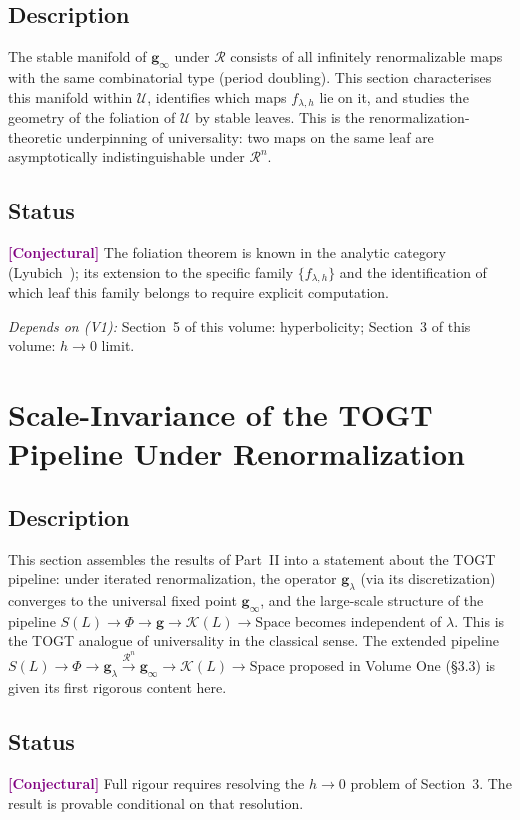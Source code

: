 \documentclass[11pt]{article}
\newcommand{\conjectural}{\textcolor{purple}{\textbf{[Conjectural]}}}
\newcommand{\depends}[1]{\smallskip\noindent\textit{Depends on (V1):} #1.\smallskip}
\newcommand{\g}{\boldsymbol{g}}
\begin{document}
\subsection*{Description}
The stable manifold of $\g_\infty$ under $\mathcal{R}$ consists of all
infinitely renormalizable maps with the same combinatorial type (period
doubling). This section characterises this manifold within $\mathcal{U}$,
identifies which maps $f_{\lambda,h}$ lie on it, and studies the geometry
of the foliation of $\mathcal{U}$ by stable leaves. This is the
renormalization-theoretic underpinning of universality: two maps on the
same leaf are asymptotically indistinguishable under $\mathcal{R}^n$.

\subsection*{Status}
\conjectural{} The foliation theorem is known in the analytic category
(Lyubich~\cite{lyubich1999}); its extension to the specific family
$\{f_{\lambda,h}\}$ and the identification of which leaf this family
belongs to require explicit computation.

\depends{Section~5 of this volume: hyperbolicity;
Section~3 of this volume: $h \to 0$ limit}

\section{Scale-Invariance of the TOGT Pipeline Under Renormalization}

\subsection*{Description}
This section assembles the results of Part~II into a statement about the
TOGT pipeline: under iterated renormalization, the operator $\g_\lambda$
(via its discretization) converges to the universal fixed point $\g_\infty$,
and the large-scale structure of the pipeline
$S(L) \to \Phi \to \g \to \mathcal{K}(L) \to \text{Space}$
becomes independent of $\lambda$. This is the TOGT analogue of universality
in the classical sense. The extended pipeline
$S(L) \to \Phi \to \g_\lambda \xrightarrow{\mathcal{R}^n} \g_\infty \to
\mathcal{K}(L) \to \text{Space}$
proposed in Volume One (\S3.3) is given its first rigorous content here.

\subsection*{Status}
\conjectural{} Full rigour requires resolving the $h \to 0$ problem of
Section~3. The result is provable conditional on that resolution.
\end{document}
